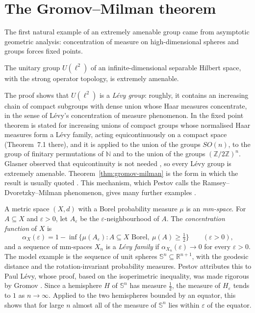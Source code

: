 \section{The Gromov--Milman theorem}\label{sec:gromov-milman}

The first natural example of an extremely amenable group came from asymptotic
geometric analysis: concentration of measure on high-dimensional spheres and
groups forces fixed points.

\begin{theorem}\label{thm:gromov-milman}
The unitary group $U(\ell^2)$ of an infinite-dimensional separable Hilbert
space, with the strong operator topology, is extremely amenable.
\end{theorem}

\begin{remark}\label{rem:levy}
The proof shows that $U(\ell^2)$ is a \emph{Lévy group}: roughly, it contains
an increasing chain of compact subgroups with dense union whose Haar measures
concentrate, in the sense of Lévy's concentration of measure phenomenon.
In \cite{GromovMilman1983} the fixed point theorem is stated for increasing
unions of compact groups whose normalised Haar measures form a Lévy family,
acting equicontinuously on a compact space (Theorem~7.1 there), and it is
applied to the union of the groups $SO(n)$, to the group of finitary
permutations of $\mathbb{N}$ and to the union of the groups
$(\mathbb{Z}/2\mathbb{Z})^n$. Glasner observed that equicontinuity is not
needed \cite{Glasner1998}, so every Lévy group is extremely amenable.
Theorem~\ref{thm:gromov-milman} is the form in which the result is usually
quoted \cite{Uspenskij2000,GiordanoPestov2007}. This mechanism, which Pestov
calls the Ramsey--Dvoretzky--Milman phenomenon, gives many further examples
\cite{Pestov2006}.
\end{remark}

\begin{remark}\label{rem:sphere-concentration}
A metric space $(X,d)$ with a Borel probability measure $\mu$ is an
\emph{mm-space}. For $A\subseteq X$ and $\varepsilon>0$, let $A_\varepsilon$ be
the $\varepsilon$-neighbourhood of $A$. The \emph{concentration function} of
$X$ is
\[
\alpha_X(\varepsilon)=1-\inf\{\mu(A_\varepsilon): A\subseteq X\text{ Borel},\
\mu(A)\geq\tfrac12\}\qquad(\varepsilon>0),
\]
and a sequence of mm-spaces $X_n$ is a \emph{Lévy family} if
$\alpha_{X_n}(\varepsilon)\to0$ for every $\varepsilon>0$. The model example
is the sequence of unit spheres $\mathbb{S}^n\subseteq\mathbb{R}^{n+1}$, with
the geodesic distance and the rotation-invariant probability measures. Pestov
attributes this to Paul Lévy, whose proof, based on the isoperimetric
inequality, was made rigorous by Gromov
\cite[Definitions~2 and~3, Example~1]{PestovMM2002}. Since a hemisphere $H$ of
$\mathbb{S}^n$ has measure $\frac12$, the measure of $H_\varepsilon$ tends to
$1$ as $n\to\infty$. Applied to the two hemispheres bounded by an equator,
this shows that for large $n$ almost all of the measure of $\mathbb{S}^n$ lies
within $\varepsilon$ of the equator.
\end{remark}

